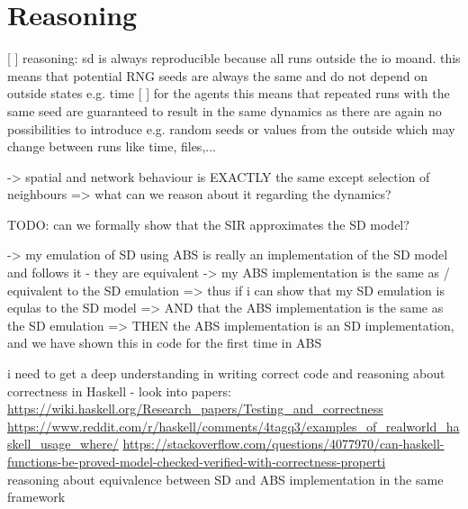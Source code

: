 \section{Reasoning}
[ ] reasoning: sd is always reproducible because all runs outside the io moand. this means that potential RNG seeds are always the same and do not depend on outside states e.g. time
[ ] for the agents this means that repeated runs with the same seed are guaranteed to result in the same dynamics as there are again no possibilities to introduce e.g. random seeds or values from the outside which may change between runs like time, files,...

-> spatial and network behaviour is EXACTLY the same except selection of neighbours => what can we reason about it regarding the dynamics?

TODO: can we formally show that the SIR approximates the SD model?

		-> my emulation of SD using ABS is really an implementation of the SD model and follows it - they are equivalent
		-> my ABS implementation is the same as / equivalent to the SD emulation
			=> thus if i can show that my SD emulation is equlas to the SD model
			=> AND that the ABS implementation is the same as the SD emulation
			=> THEN the ABS implementation is an SD implementation, and we have shown this in code for the first time in ABS


i need to get a deep understanding in writing correct code and reasoning about correctness in Haskell - look into papers:
\url{https://wiki.haskell.org/Research_papers/Testing_and_correctness}
\url{https://www.reddit.com/r/haskell/comments/4tagq3/examples_of_realworld_haskell_usage_where/}
\url{https://stackoverflow.com/questions/4077970/can-haskell-functions-be-proved-model-checked-verified-with-correctness-properti}\\

reasoning about equivalence between SD and ABS implementation in the same framework